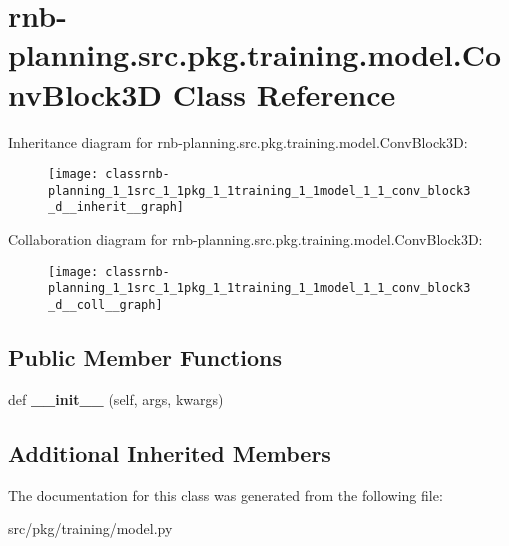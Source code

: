 \hypertarget{classrnb-planning_1_1src_1_1pkg_1_1training_1_1model_1_1_conv_block3_d}{}\section{rnb-\/planning.src.\+pkg.\+training.\+model.\+Conv\+Block3D Class Reference}
\label{classrnb-planning_1_1src_1_1pkg_1_1training_1_1model_1_1_conv_block3_d}


Inheritance diagram for rnb-\/planning.src.\+pkg.\+training.\+model.\+Conv\+Block3D\+:\nopagebreak
\begin{figure}[H]
\begin{center}
\leavevmode
\texttt{[image: classrnb-planning\_1\_1src\_1\_1pkg\_1\_1training\_1\_1model\_1\_1\_conv\_block3\_d\_\_inherit\_\_graph]}
\end{center}
\end{figure}


Collaboration diagram for rnb-\/planning.src.\+pkg.\+training.\+model.\+Conv\+Block3D\+:\nopagebreak
\begin{figure}[H]
\begin{center}
\leavevmode
\texttt{[image: classrnb-planning\_1\_1src\_1\_1pkg\_1\_1training\_1\_1model\_1\_1\_conv\_block3\_d\_\_coll\_\_graph]}
\end{center}
\end{figure}
\subsection*{Public Member Functions}
\begin{DoxyCompactItemize}
\item 
\mbox{\label{classrnb-planning_1_1src_1_1pkg_1_1training_1_1model_1_1_conv_block3_d_aaf5bc71054db30a52e4771ded9edf1be}} 
def {\bfseries \+\_\+\+\_\+init\+\_\+\+\_\+} (self, args, kwargs)
\end{DoxyCompactItemize}
\subsection*{Additional Inherited Members}


The documentation for this class was generated from the following file\+:\begin{DoxyCompactItemize}
\item 
src/pkg/training/model.\+py\end{DoxyCompactItemize}
